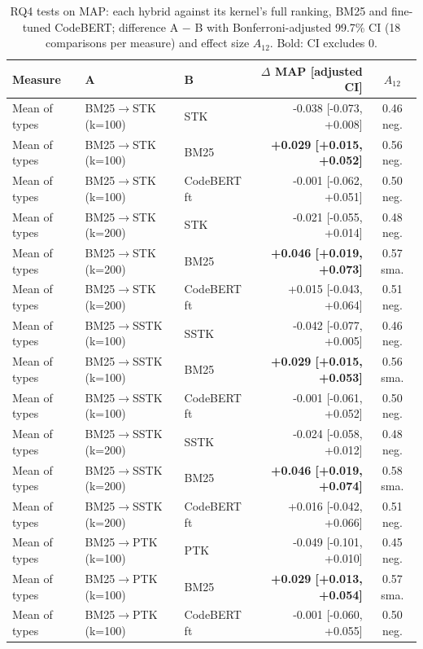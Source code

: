 \begin{table}[!htbp]
\centering
\caption{RQ4 tests on MAP: each hybrid against its kernel's full ranking, BM25 and fine-tuned CodeBERT; difference A $-$ B with Bonferroni-adjusted 99.7\% CI (18 comparisons per measure) and effect size $A_{12}$. Bold: CI excludes 0.}
\label{tab:rq4effects}
\footnotesize
\setlength{\tabcolsep}{4pt}
\begin{tabular}{lllrc}
\toprule
Measure & A & B & $\Delta$ MAP [adjusted CI] & $A_{12}$ \\
\midrule
Mean of types & BM25$\rightarrow$STK (k=100) & STK & -0.038 [-0.073, +0.008] & 0.46 neg. \\
Mean of types & BM25$\rightarrow$STK (k=100) & BM25 & \textbf{+0.029 [+0.015, +0.052]} & 0.56 neg. \\
Mean of types & BM25$\rightarrow$STK (k=100) & CodeBERT ft & -0.001 [-0.062, +0.051] & 0.50 neg. \\
Mean of types & BM25$\rightarrow$STK (k=200) & STK & -0.021 [-0.055, +0.014] & 0.48 neg. \\
Mean of types & BM25$\rightarrow$STK (k=200) & BM25 & \textbf{+0.046 [+0.019, +0.073]} & 0.57 sma. \\
Mean of types & BM25$\rightarrow$STK (k=200) & CodeBERT ft & +0.015 [-0.043, +0.064] & 0.51 neg. \\
Mean of types & BM25$\rightarrow$SSTK (k=100) & SSTK & -0.042 [-0.077, +0.005] & 0.46 neg. \\
Mean of types & BM25$\rightarrow$SSTK (k=100) & BM25 & \textbf{+0.029 [+0.015, +0.053]} & 0.56 sma. \\
Mean of types & BM25$\rightarrow$SSTK (k=100) & CodeBERT ft & -0.001 [-0.061, +0.052] & 0.50 neg. \\
Mean of types & BM25$\rightarrow$SSTK (k=200) & SSTK & -0.024 [-0.058, +0.012] & 0.48 neg. \\
Mean of types & BM25$\rightarrow$SSTK (k=200) & BM25 & \textbf{+0.046 [+0.019, +0.074]} & 0.58 sma. \\
Mean of types & BM25$\rightarrow$SSTK (k=200) & CodeBERT ft & +0.016 [-0.042, +0.066] & 0.51 neg. \\
Mean of types & BM25$\rightarrow$PTK (k=100) & PTK & -0.049 [-0.101, +0.010] & 0.45 neg. \\
Mean of types & BM25$\rightarrow$PTK (k=100) & BM25 & \textbf{+0.029 [+0.013, +0.054]} & 0.57 sma. \\
Mean of types & BM25$\rightarrow$PTK (k=100) & CodeBERT ft & -0.001 [-0.060, +0.055] & 0.50 neg. \\

\end{tabular}
\end{table}

